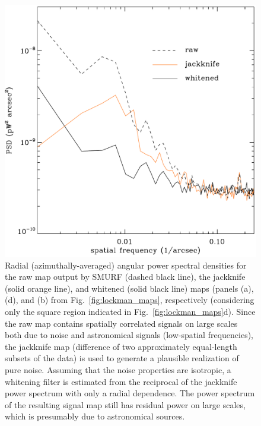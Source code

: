 \documentclass[useAMS,usenatbib,nofootinbib]{mn2e}
\begin{document}
\begin{figure}
\centering
\includegraphics[width=\linewidth]{lockman_pspec.pdf}
\caption{Radial (azimuthally-averaged) angular power spectral
  densities for the raw map output by SMURF (dashed black line), the
  jackknife (solid orange line), and whitened (solid black line) maps
  (panels (a), (d), and (b) from Fig.~\ref{fig:lockman_maps},
  respectively (considering only the square region indicated in
  Fig.~\ref{fig:lockman_maps}d). Since the raw map contains spatially
  correlated signals on large scales both due to noise and
  astronomical signals (low-spatial frequencies), the jackknife map
  (difference of two approximately equal-length subsets of the data)
  is used to generate a plausible realization of pure noise. Assuming
  that the noise properties are isotropic, a whitening filter is
  estimated from the reciprocal of the jackknife power spectrum with
  only a radial dependence. The power spectrum of the resulting signal
  map still has residual power on large scales, which is presumably
  due to astronomical sources.}
\label{fig:lockman_pspec}
\end{figure}
\end{document}
